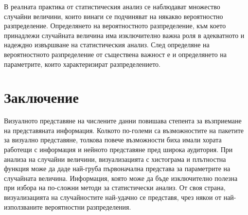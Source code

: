 В реалната практика от статистическия анализ се наблюдават множество случайни величини, които винаги се подчиняват на някакво вероятностно разпределение. Определянето на вероятностното разпределение, към което принадлежи случайната величина има изключително важна роля в адекватното и надеждно извършване на статистическия анализ. След определяне на вероятностното разпределение от съществена важност е и определянето на параметрите, които характеризират разпределението.  

\section*{Заключение}

Визуалното представяне на числените данни повишава степента за възприемане на представяната информация. Колкото по-големи са възможностите на пакетите за визуално представяне, толкова повече възможности биха имали хората работещи с информация и нейното представяне пред широка аудитория. При анализа на случайни величини, визуализацията с хистограма и плътностна функция може да даде най-груба първоначална представа за параметрите на случайната величина. Информация, която може да бъде изключително полезна при избора на по-сложни методи за статистически анализ. От своя страна, визуализацията на случайностите най-удачно се представя, чрез някои от най-използваните вероятностни разпределения. 
 

